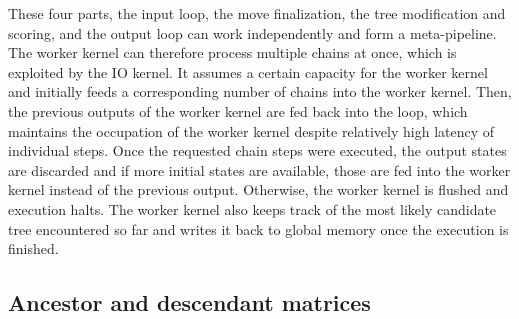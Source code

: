 These four parts, the input loop, the move finalization, the tree modification and scoring, and the output loop can work independently and form a meta-pipeline. The worker kernel can therefore process multiple chains at once, which is exploited by the IO kernel. It assumes a certain capacity for the worker kernel and initially feeds a corresponding number of chains into the worker kernel. Then, the previous outputs of the worker kernel are fed back into the loop, which maintains the occupation of the worker kernel despite relatively high latency of individual steps. Once the requested chain steps were executed, the output states are discarded and if more initial states are available, those are fed into the worker kernel instead of the previous output. Otherwise, the worker kernel is flushed and execution halts. The worker kernel also keeps track of the most likely candidate tree encountered so far and writes it back to global memory once the execution is finished.

\subsection{Ancestor and descendant matrices}
\label{subsec:ancestor_matrix}

